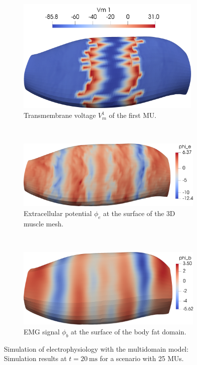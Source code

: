 \begin{figure}
  \centering%
  \begin{subfigure}[t]{\textwidth}%
    \centering%
    \includegraphics[width=9cm]{images/results/application/multidomain_25mus_snapshot.png}%
    \caption{Transmembrane voltage $V_m^1$ of the first MU.}%
    \label{fig:multidomain_25mus_snapshot}%
  \end{subfigure} \\[4mm]
  \begin{subfigure}[t]{\textwidth}%
    \centering%
    \includegraphics[width=10cm]{images/results/application/multidomain_25mus2_emg.png}%
    \caption{Extracellular potential $\phi_e$ at the surface of the 3D muscle mesh.}%
    \label{fig:multidomain_25mus2_emg}%
  \end{subfigure} \\[4mm]
  \begin{subfigure}[t]{\textwidth}%
    \centering%
    \includegraphics[width=10cm]{images/results/application/multidomain_25mus2_body.png}%
    \caption{EMG signal $\phi_b$ at the surface of the body fat domain.}%
    \label{fig:multidomain_25mus2_body}%
  \end{subfigure}
  \caption{Simulation of electrophysiology with the multidomain model: Simulation results at $t=\SI{20}{\ms}$ for a scenario with 25 MUs.}%
  \label{fig:multidomain_25mus2}%
\end{figure}%


